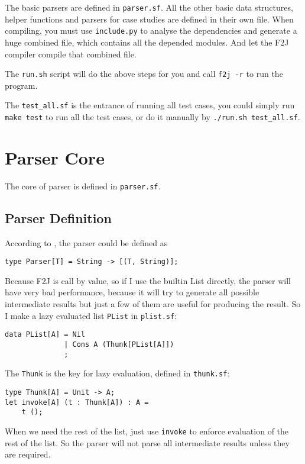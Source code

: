 The basic parsers are defined in \texttt{parser.sf}. All the other basic data structures, helper functions and parsers for case studies are defined in their own file. When compiling, you must use \texttt{include.py} to analyse the dependencies and generate a huge combined file, which contains all the depended modules. And let the F2J compiler compile that combined file.

The \texttt{run.sh} script will do the above steps for you and call \texttt{f2j -r} to run the program.

The \texttt{test\_all.sf} is the entrance of running all test cases, you could simply run \texttt{make test} to run all the test cases, or do it manually by \texttt{./run.sh test\_all.sf}.

\section{Parser Core}

The core of parser is defined in \texttt{parser.sf}.

\subsection{Parser Definition}

According to \cite{Hutton:1996}, the parser could be defined as

\begin{lstlisting}
type Parser[T] = String -> [(T, String)];
\end{lstlisting}

Because F2J is call by value, so if I use the builtin List directly, the parser will have very bad performance, because it will try to generate all possible intermediate results but just a few of them are useful for producing the result. So I make a lazy evaluated list \texttt{PList} in \texttt{plist.sf}:

\begin{lstlisting}
data PList[A] = Nil
              | Cons A (Thunk[PList[A]])
              ;
\end{lstlisting}

The \texttt{Thunk} is the key for lazy evaluation, defined in \texttt{thunk.sf}:

\begin{lstlisting}
type Thunk[A] = Unit -> A;
let invoke[A] (t : Thunk[A]) : A =
    t ();
\end{lstlisting}

When we need the rest of the list, just use \texttt{invoke} to enforce evaluation of the rest of the list. So the parser will not parse all intermediate results unless they are required.

